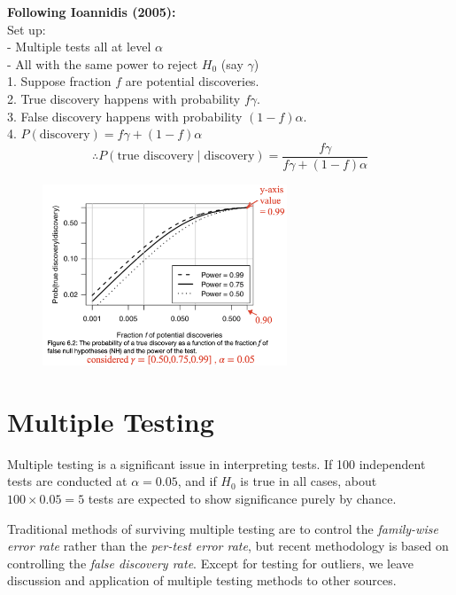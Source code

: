 \documentclass[14pt]{extarticle}
\begin{document}
\noindent
\textbf{Following Ioannidis (2005):}\\
Set up:\\
 - Multiple tests all at level $\alpha$\\
 - All with the same power to reject $H_0$ (say $\gamma$)\\
1. Suppose fraction $f$ are potential discoveries.\\
2. True discovery happens with probability $f\gamma$.\\
3. False discovery happens with probability $(1 - f) \alpha$.\\
4. $P(\text{discovery}) = f\gamma + (1 - f) \alpha$\\
\[
\therefore P(\text{true discovery} \mid \text{discovery}) =
\frac{f\gamma}{f\gamma + (1 - f) \alpha}
\]
\begin{figure}[H]
    \centering
    \includegraphics[width=0.65\textwidth]{fig6.png}
\end{figure}

\section*{Multiple Testing}
Multiple testing is a significant issue in interpreting tests. If 100 independent tests are conducted at $\alpha = 0.05$, and if $H_0$ is true in all cases, about $100 \times 0.05 = 5$ tests are expected to show significance purely by chance.

Traditional methods of surviving multiple testing are to control the \textit{family-wise error rate} rather than the \textit{per-test error rate}, but recent methodology is based on controlling the \textit{false discovery rate}. Except for testing for outliers, we leave discussion and application of multiple testing methods to other sources.
\end{document}

